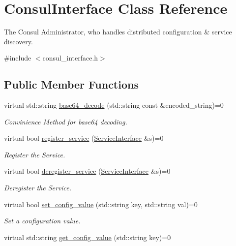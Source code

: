 \hypertarget{classConsulInterface}{\section{Consul\-Interface Class Reference}
\label{classConsulInterface}
}


The Consul Administrator, who handles distributed configuration \& service discovery.  




{\ttfamily \#include $<$consul\-\_\-interface.\-h$>$}

\subsection*{Public Member Functions}
\begin{DoxyCompactItemize}
\item 
virtual std\-::string \hyperlink{classConsulInterface_a636b134672f2c150f6b38fc821fb2348}{base64\-\_\-decode} (std\-::string const \&encoded\-\_\-string)=0
\begin{DoxyCompactList}\small\item\em Convinience Method for base64 decoding. \end{DoxyCompactList}\item 
\hypertarget{classConsulInterface_ad1d3a241b2fc31e4b13789a49a0d010a}{virtual bool \hyperlink{classConsulInterface_ad1d3a241b2fc31e4b13789a49a0d010a}{register\-\_\-service} (\hyperlink{classServiceInterface}{Service\-Interface} \&s)=0}\label{classConsulInterface_ad1d3a241b2fc31e4b13789a49a0d010a}

\begin{DoxyCompactList}\small\item\em Register the Service. \end{DoxyCompactList}\item 
\hypertarget{classConsulInterface_ac97f7a426f3de5023edc637ab984b4c4}{virtual bool \hyperlink{classConsulInterface_ac97f7a426f3de5023edc637ab984b4c4}{deregister\-\_\-service} (\hyperlink{classServiceInterface}{Service\-Interface} \&s)=0}\label{classConsulInterface_ac97f7a426f3de5023edc637ab984b4c4}

\begin{DoxyCompactList}\small\item\em Deregister the Service. \end{DoxyCompactList}\item 
virtual bool \hyperlink{classConsulInterface_a98ce2623db59b3f8804691a4039957a8}{set\-\_\-config\-\_\-value} (std\-::string key, std\-::string val)=0
\begin{DoxyCompactList}\small\item\em Set a configuration value. \end{DoxyCompactList}\item 
\hypertarget{classConsulInterface_a1cc4bdfe75f86f69626e109847aba6af}{virtual std\-::string \hyperlink{classConsulInterface_a1cc4bdfe75f86f69626e109847aba6af}{get\-\_\-config\-\_\-value} (std\-::string key)=0}\label{classConsulInterface_a1cc4bdfe75f86f69626e109847aba6af}


\end{DoxyCompactItemize}
